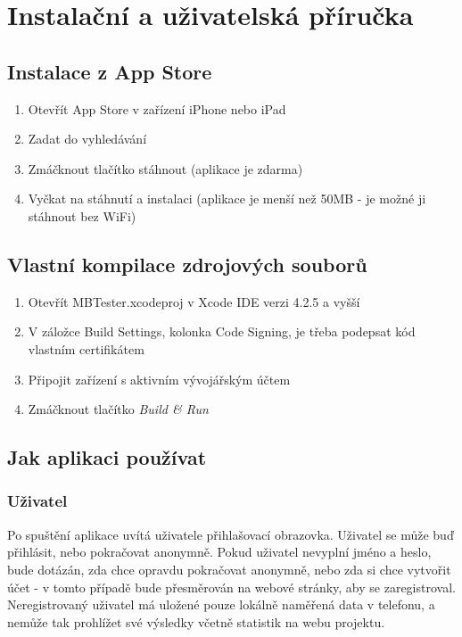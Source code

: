 \chapter{Instalační a uživatelská příručka}

\section{Instalace z App Store}

\begin{enumerate}
	\item Otevřít App Store v zařízení iPhone nebo iPad
	\item Zadat do vyhledávání 
	\item Zmáčknout tlačítko stáhnout (aplikace je zdarma)
	\item Vyčkat na stáhnutí a instalaci (aplikace je menší než 50MB - je možné ji stáhnout bez WiFi\cite{APPIN})
\end{enumerate}

\section{Vlastní kompilace zdrojových souborů}

\begin{enumerate}
	\item Otevřít MBTester.xcodeproj v Xcode IDE verzi 4.2.5 a vyšší
	\item V záložce Build Settings, kolonka Code Signing, je třeba podepsat kód vlastním certifikátem
	\item Připojit zařízení s aktivním vývojářským účtem
	\item Zmáčknout tlačítko \emph{Build \& Run}
\end{enumerate}

\section{Jak aplikaci používat}

\subsection{Uživatel}
Po spuštění aplikace uvítá uživatele přihlašovací obrazovka. Uživatel se může buď přihlásit, nebo pokračovat anonymně. Pokud uživatel nevyplní jméno a heslo, bude dotázán, zda chce opravdu pokračovat anonymně, nebo zda si chce vytvořit účet - v tomto případě bude přesměrován na webové stránky, aby se zaregistroval. Neregistrovaný uživatel má uložené pouze lokálně naměřená data v telefonu, a nemůže tak prohlížet své výsledky včetně statistik na webu projektu.

